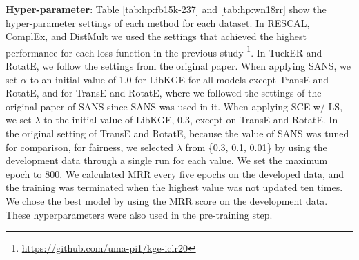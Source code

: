 \noindent\textbf{Hyper-parameter}: Table \ref{tab:hp:fb15k-237} and \ref{tab:hp:wn18rr} show the hyper-parameter settings of each method for each dataset.
In RESCAL, ComplEx, and DistMult we used the settings that achieved the highest performance for each loss function in the previous study \cite{Ruffinelli2020You}\footnote{\url{https://github.com/uma-pi1/kge-iclr20}}.
In TuckER and RotatE, we follow the settings from the original paper. When applying SANS, we set $\alpha$ to an initial value of 1.0 for LibKGE for all models except TransE and RotatE, and for TransE and RotatE, where we followed the settings of the original paper of SANS since SANS was used in it.
When applying SCE w/ LS, we set $\lambda$ to the initial value of LibKGE, 0.3, except on TransE and RotatE.
In the original setting of TransE and RotatE, because the value of SANS was tuned for comparison, for fairness, we selected $\lambda$ from \{0.3, 0.1, 0.01\} by using the development data through a single run for each value.
We set the maximum epoch to 800.
We calculated MRR every five epochs on the developed data, and the training was terminated when the highest value was not updated ten times.
We chose the best model by using the MRR score on the development data. 
These hyperparameters were also used in the pre-training step.

